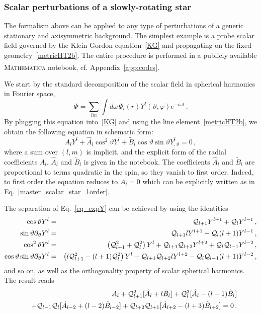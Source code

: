 \documentclass[11pt]{article}
\newcommand{\pa}{\partial}
\newcommand{\nn}{\nonumber}
\def\th{\vartheta}
\def\lp{{l+1}}
\def\lm{{l-1}}
\def\lpp{{l+2}}
\def\lmm{{l-2}}
\numberwithin{equation}{section} %
\begin{document}
\subsubsection{Scalar perturbations of a slowly-rotating star}

The formalism above can be applied to any type of perturbations of a generic stationary and axisymmetric background. The simplest example is a probe scalar field governed by the Klein-Gordon equation~\eqref{KG} and propagating on the fixed geometry~\eqref{metricHT2b}. The entire procedure is performed in a publicly available {\scshape Mathematica}\textsuperscript{\textregistered} notebook, cf. Appendix~\ref{app:codes}.

We start by the standard decomposition of the scalar field in spherical harmonics in Fourier space,
\begin{equation}
 \Phi=\sum_{l m}\int d\omega\, \Psi_l(r)Y^l(\vartheta,\varphi) e^{-i\omega t}\,.
\end{equation}
By plugging this equation into~\eqref{KG} and using the line element~\eqref{metricHT2b}, we obtain the following equation in schematic form:
\begin{equation}
 A_{l} Y^l+ \hat A_l \cos^2\vartheta Y^l+\tilde{B}_l\cos\th\sin\th Y^l_{,\th}=0\,,\label{eq_expY}
\end{equation}
where a sum over $(l,m)$ is implicit, and the explicit form of the radial coefficients
$A_l$, $\hat{A}_l$ and $\tilde B_l$ is given in the notebook. The coefficients $\hat{A}_l$ and $\tilde{B}_l$ are proportional to terms quadratic in the spin, so they vanish to first order. Indeed, to first order the equation reduces to $A_l=0$ which can be explicitly written as in Eq.~\eqref{master_scalar_star_1order}.

The separation of Eq.~\eqref{eq_expY} can be achieved by using the
identities~\cite{Kojima:1992ie}
\begin{eqnarray}
\cos\th Y^{l}&=&{\cal Q}_{l+1}Y^{l+1}+{\cal Q}_{l}Y^{l-1}\,,\nn\\
\sin\th \partial_\vartheta Y^{l}&=&
{\cal Q}_{l+1}l Y^{l+1}-{\cal Q}_{l}(l+1)Y^{l-1}\,,\nn\\
\cos^2\th Y^{l}&=&\left({\cal Q}_\lp^2 + {\cal Q}_l^2\right)Y^l+{\cal Q}_\lp {\cal Q}_\lpp Y^\lpp + {\cal Q}_l {\cal Q}_\lm Y^\lmm\,,\nn\\
\cos\th\sin\th \pa_\th Y^{l}&=&\left(l{\cal Q}_\lp^2 -(l+1){\cal Q}_l^2\right)Y^l+{\cal Q}_\lp {\cal Q}_\lpp l Y^\lpp- {\cal Q}_l {\cal Q}_\lm (l+1) Y^\lmm\,,\nn
\end{eqnarray}
and so on, as well as the orthogonality property of scalar spherical harmonics.
%
The result reads
\begin{eqnarray}
&& A_l+{\cal Q}_{l+1}^2[\hat{A}_l+l\tilde{B}_l]+{\cal Q}_{l}^2[\hat{A}_l-(l+1)\tilde{B}_l]\nn\\
&&+{\cal Q}_{l-1}{\cal Q}_{l} [\hat{A}_{l-2}+(l-2)\tilde{B}_{l-2}]+{\cal Q}_{l+2}
{\cal Q}_{l+1} [\hat{A}_{l+2 }-(l+3)\tilde{B}_{l+2}]=0\label{final_schematic}\,.
\end{eqnarray}
\end{document}
